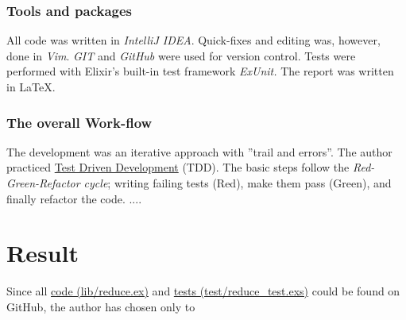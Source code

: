 \documentclass[a4paper,11pt]{article}
\begin{document}
\subsubsection*{Tools and packages}
\label{subsec:tools}
All code was written in \emph{IntelliJ IDEA}.
Quick-fixes and editing was, however, done in \emph{Vim}.
\emph{GIT} and \emph{GitHub} were used for version control.
Tests were performed with Elixir's built-in test framework \emph{ExUnit.}
The report was written in \LaTeX.

\subsubsection*{The overall Work-flow}
\label{subsec:workflow}
The development was an iterative approach with ''trail and errors''.
The author practiced
\href{https://www.elixirwiki.com/wiki/Test-Driven_Development_in_Elixir}{Test Driven Development}
(TDD).
The basic steps follow the \emph{Red-Green-Refactor cycle};
writing failing tests (Red), make them pass (Green),
and finally refactor the code.
....


\section*{Result}
\label{sec:result}
Since all
\href{https://github.com/VincentFerrigan/kth-id1019-programming-ii/tree/main/tasks/4/reduce/lib/reduce.ex}{code (lib/reduce.ex)} and %
\href{https://github.com/VincentFerrigan/kth-id1019-programming-ii/tree/main/tasks/4/reduce/test/reduce_test.exs}{tests (test/reduce\_test.exs)}
could be found on GitHub, the author has chosen only to %

%
%
\end{document}
